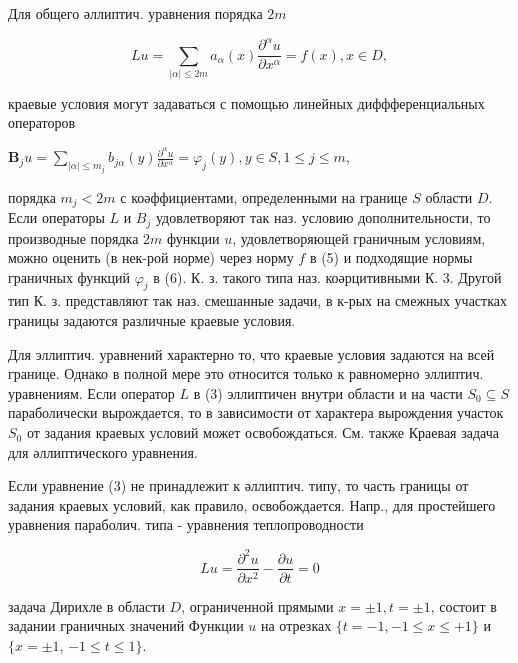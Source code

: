 \documentclass[10pt]{article}
\begin{document}
Для общего әллиптич. уравнения порядка $2 m$



\[

L u=\sum_{|\alpha| \leqslant 2 m} a_{\alpha}(x) \frac{\partial^{\alpha} u}{\partial x^{\alpha}}=f(x), x \in D,

\]



краевые условия могут задаваться с помощью линейных диффференциальных операторов



$\boldsymbol{B}_{j} u=\sum_{|\alpha| \leqslant m_{j}} b_{j \alpha}(y) \frac{\partial^{\alpha} u}{\partial x^{\alpha}}=\varphi_{j}(y), y \in S, 1 \leqslant j \leqslant m$,



порядка $m_{j}<2 m$ с коәффициентами, определенными на границе $S$ области $D$. Если операторы $L$ и $B_{j}$ удовлетворяют так наз. условию дополнительности, то производные порядка $2 m$ функции $u$, удовлетворяющей граничным условиям, можно оценить (в нек-рой норме) через норму $f$ в (5) и подходящие нормы граничных функций $\varphi_{j}$ в (6). К. з. такого типа наз. коәрцитивными К. 3. Другой тип К. з. представляют так наз. смешанные задачи, в к-рых на смежных участках границы задаются различные краевые условия.



Для эллиптич. уравнений характерно то, что краевые условия задаются на всей границе. Однако в полной мере это относится только к равномерно эллиптич. уравнениям. Если оператор $L$ в (3) эллиптичен внутри области и на части $S_{0} \subseteq S$ параболически вырождается, то в зависимости от характера вырождения участок $S_{0}$ от задания краевых условий может освобождаться. См. также Краевая задача для әллиптического уравнения.



Если уравнение (3) не принадлежит к әллиптич. типу, то часть границы от задания краевых условий, как правило, освобождается. Напр., для простейшего уравнения параболич. типа - уравнения теплопроводности



\[

L u=\frac{\partial^{2} u}{\partial x^{2}}-\frac{\partial u}{\partial t}=0

\]



задача Дирихле в области $D$, ограниченной прямыми $x= \pm 1, t= \pm 1$, состоит в задании граничных значений Функции $u$ на отрезках $\{t=-1,-1 \leqslant x \leqslant+1\}$ и $\{x= \pm 1$, $-1 \leqslant t \leqslant 1\}$.
\end{document}
